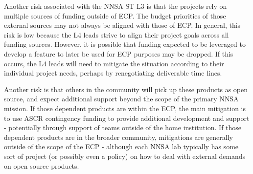 Another risk associated with the NNSA ST L3 is that the projects rely
on multiple sources of funding outside of ECP. The budget priorities of 
those external sources may not always be aligned with those of ECP. In general,
this risk is low because the L4 leads strive to align their project goals across 
all funding sources. However, it is possible that funding expected to be leveraged
to develop a feature to later be used for ECP purposes may be dropped. If this 
occurs, the L4 leads will need to mitigate the situation according to their 
individual project needs, perhaps by renegotiating deliverable time lines.

Another risk is that others in the community will pick up these
products as open source, and expect additional support beyond the
scope of the primary NNSA mission. If those dependent products are within the
ECP, the main mitigation is to use ASCR contingency funding to provide
additional development and support - potentially through support of teams
outside of the home institution. If those dependent products are in
the broader community, mitigations are generally outside of the scope
of the ECP - although each NNSA lab typically has some sort of project
(or possibly even a policy) on how to deal with external demands on
open source products.



